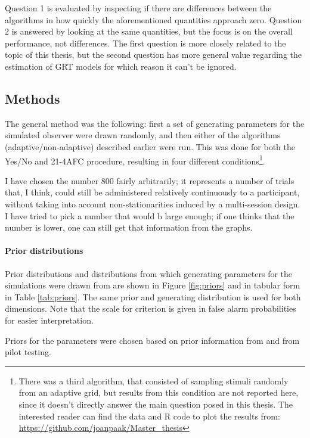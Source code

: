 \documentclass{article}\usepackage{knitr}
\begin{document}
Question 1 is evaluated by inspecting if there are differences between the algorithms in how quickly the aforementioned quantities approach zero. Question 2 is answered by looking at the same  quantities, but the focus is on the overall performance, not differences. The first question is more closely related to the topic of this thesis, but the second question has more general value regarding the estimation of GRT models for which reason it can't be ignored. 

\subsection{Methods}

The general method was the following: first a set of generating parameters for the simulated observer were drawn randomly, and then either of the algorithms (adaptive/non-adaptive) described earlier were run. This was done for both the Yes/No and 21-4AFC procedure, resulting in four different conditions\footnote{There was a third algorithm, that consisted of sampling stimuli randomly from an adaptive grid, but results from this condition are not reported here, since it doesn't directly answer the main question posed in this thesis. The interested reader can find the data and R code to plot the results from: \url{https://github.com/joanpaak/Master_thesis}}. 

I have chosen the number 800 fairly arbitrarily; it represents a number of trials that, I think, could still be administered relatively continuously to a participant, without taking into account non-stationarities induced by a multi-session design. I have tried to pick a number that would b large enough; if one thinks that the number is lower, one can still get that information from the graphs. 

\paragraph{Prior distributions}

Prior distributions and distributions from which generating parameters for the simulations were drawn from are shown in Figure \ref{fig:priors} and in tabular form in Table \ref{tab:priors}. The same prior and generating distribution is used for both dimensions. Note that the scale for criterion is given in false alarm probabilities for easier interpretation. 

Priors for the parameters were chosen based on prior information from \citet{silbert2009} and from pilot testing. 
\end{document}
